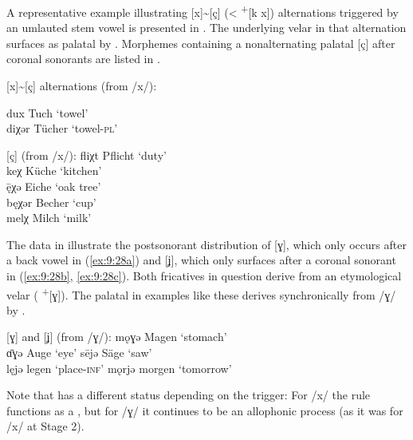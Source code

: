 A representative example illustrating [x]{\textasciitilde}[ç] (< \textsuperscript{+}[k x]) alternations triggered by an umlauted stem vowel is presented in . The underlying velar in that alternation surfaces as palatal by . Morphemes containing a nonalternating palatal [ç] after coronal sonorants are listed in .

\ea%
\label{ex:9:26} [x]{\textasciitilde}[ç] alternations (from /x/):\\
\begin{xlist}
  \sn
dux \tab [dux] \tab Tuch \tab ‘towel’ \\
diχər \tab [diçər] \tab Tücher \tab ‘towel-\textsc{pl}’ 
\end{xlist}
\ex%
\label{ex:9:27} [ç] (from /x/):
\ea\label{ex:9:27a} fliχt \tab  [fliçt] \tab Pflicht \tab ‘duty’ \\
    keχ \tab [keç] \tab Küche \tab ‘kitchen’ \\
    \={ę}χə \tab [ɛːçə] \tab Eiche \tab ‘oak tree’ \\
    bęχər \tab [bɛçər] \tab Becher \tab ‘cup’ \\
\ex\label{ex:9:27b} melχ \tab [milç] \tab Milch \tab ‘milk’ 
   \z
\z 

The data in  illustrate the postsonorant distribution of [ɣ], which only occurs after a back vowel in (\ref{ex:9:28a}) and [ʝ], which only surfaces after a coronal sonorant in (\ref{ex:9:28b}, \ref{ex:9:28c}). Both fricatives in question derive from an etymological velar ( \textsuperscript{+}[ɣ]). The palatal in examples like these derives synchronically from /ɣ/ by .

\ea%
\label{ex:9:28} [ɣ] and [ʝ] (from /ɣ/):
\ea\label{ex:9:28a} mǫɣə \tab [mɔːɣə] \tab Magen \tab ‘stomach’ \\
    ɑ̄ɣə \tab [ɑːɣə] \tab Auge \tab ‘eye’ 
\ex\label{ex:9:28b} sējə \tab [seːʝə] \tab Säge \tab ‘saw’ \\
    lęjə \tab [lɛʝə] \tab legen \tab ‘place-\textsc{inf}’ 
\ex\label{ex:9:28c} mǫrjə \tab [mɔrʝə] \tab morgen \tab ‘tomorrow’ 
   \z
\z 

Note that  has a different status depending on the trigger: For /x/ the rule functions as a , but for /ɣ/ it continues to be an allophonic process (as it was for /x/ at Stage 2).

